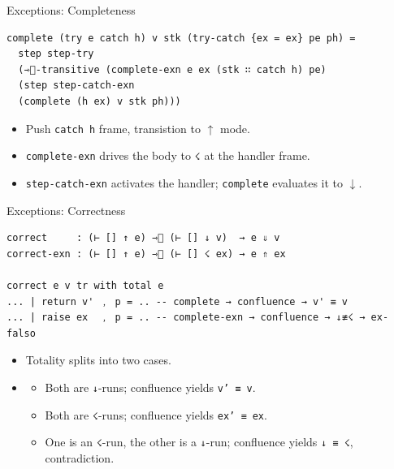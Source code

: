\documentclass[10pt,compress,aspectratio=169]{beamer}
\begin{document}
\begin{frame}[fragile]{Exceptions: Completeness}
\begin{verbatim}
complete (try e catch h) v stk (try-catch {ex = ex} pe ph) =
  step step-try
  (⇾⃰-transitive (complete-exn e ex (stk ∷ catch h) pe)
  (step step-catch-exn
  (complete (h ex) v stk ph)))
\end{verbatim}
\begin{itemize}
    \item Push \texttt{catch h} frame, transistion to $\uparrow$ mode.
    \item \texttt{complete-exn} drives the body to \verb|☇| at the handler frame.
    \item \texttt{step-catch-exn} activates the handler; \texttt{complete} evaluates it to $\downarrow$.
\end{itemize}
\end{frame}

\begin{frame}[fragile]{Exceptions: Correctness}
\begin{verbatim}
correct     : (⊢ [] ↑ e) ⇾⃰ (⊢ [] ↓ v)  → e ⇓ v
correct-exn : (⊢ [] ↑ e) ⇾⃰ (⊢ [] ☇ ex) → e ⇑ ex

correct e v tr with total e
... | return v' ﹐ p = .. -- complete → confluence → v' ≡ v
... | raise ex  ﹐ p = .. -- complete-exn → confluence → ↓≢☇ → ex-falso
\end{verbatim}
\begin{itemize}
    \item Totality splits into two cases.
    \item \begin{itemize}
        \item Both are \texttt{↓}-runs; confluence yields \texttt{v' ≡ v}.
        \item Both are \texttt{☇}-runs; confluence yields \texttt{ex' ≡ ex}.
        \item One is an \texttt{☇}-run, the other is a \texttt{↓}-run; confluence yields \texttt{↓ ≡ ☇}, contradiction.
    \end{itemize}
\end{itemize}
\end{frame}
\end{document}
